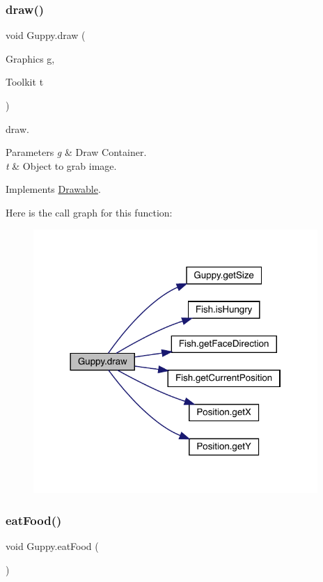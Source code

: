\subsubsection{\texorpdfstring{draw()}{draw()}}
{\footnotesize\ttfamily void Guppy.\+draw (\begin{DoxyParamCaption}\item[{Graphics}]{g,  }\item[{Toolkit}]{t }\end{DoxyParamCaption})\hspace{0.3cm}{\ttfamily [inline]}}

draw. 
\begin{DoxyParams}{Parameters}
{\em g} & Draw Container. \\
\hline
{\em t} & Object to grab image. \\
\hline
\end{DoxyParams}


Implements \mbox{\hyperlink{interface_drawable_aaddafb212b3c8e60fcc742052570c893}{Drawable}}.

Here is the call graph for this function\+:
\nopagebreak
\begin{figure}[H]
\begin{center}
\leavevmode
\includegraphics[width=306pt]{class_guppy_ad04fab448adc11ff3eecf3a76c64781b_cgraph}
\end{center}
\end{figure}
\mbox{\label{class_guppy_a2b234c201f80dbed1db3a58e4ee7840b}} 
\subsubsection{\texorpdfstring{eat\+Food()}{eatFood()}}
{\footnotesize\ttfamily void Guppy.\+eat\+Food (\begin{DoxyParamCaption}{ }\end{DoxyParamCaption})\hspace{0.3cm}{\ttfamily [inline]}}

